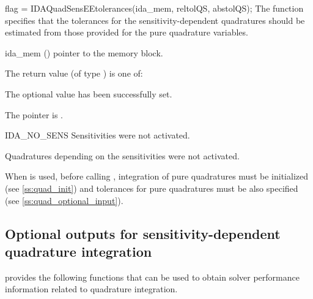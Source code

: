 {
  flag = IDAQuadSensEEtolerances(ida\_mem, reltolQS, abstolQS);
}
{
  The function  specifies that the tolerances for
  the sensitivity-dependent quadratures should be estimated from those provided
  for the pure quadrature variables. 
}
{
  \begin{args}
  \item[ida\_mem] ()
    pointer to the {\idas} memory block.
  \end{args}
}
{
  The return value  (of type ) is one of:
  \begin{args}
  \item[\Id{IDA\_SUCCESS}] 
    The optional value has been successfully set.
  \item[\Id{IDA\_MEM\_NULL}]
    The  pointer is .
  \item[IDA\_NO\_SENS]
    Sensitivities were not activated.
  \item[\Id{IDA\_NO\_QUADSENS}] 
    Quadratures depending on the sensitivities were not activated.
  \end{args}
}
{ 
  When   is used, before calling , 
  integration of pure quadratures must be initialized (see \ref{ss:quad_init})
  and tolerances for pure quadratures must be also specified 
  (see \ref{ss:quad_optional_input}).
  
}


\subsection{Optional outputs for sensitivity-dependent quadrature integration}
\label{ss:quad_sens_optional_output}

{\idas} provides the following functions that can be used to obtain solver
performance information related to quadrature integration.

